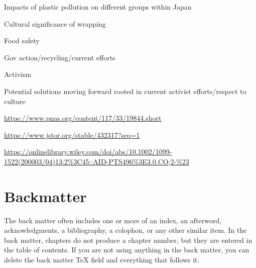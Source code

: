 \documentclass{book}\usepackage{knitr}
\begin{document}
Impacts of plastic pollution on different groups within Japan

Cultural significance of wrapping

Food safety

Gov action/recycling/current efforts

Activism

Potential solutions moving forward rooted in current activist efforts/respect to culture

\url{https://www.pnas.org/content/117/33/19844.short}

\url{https://www.jstor.org/stable/432317?seq=1}

\url{https://onlinelibrary.wiley.com/doi/abs/10.1002/1099-1522(200003/04)13:2%3C45::AID-PTS496%3E3.0.CO;2-%23}





\backmatter

\part{Backmatter}

The back matter often includes one or more of an index, an afterword, acknowledgments, a bibliography, a colophon, or any other similar item. In the back matter, chapters do not produce a chapter number, but they are entered in the table of contents. If you are not using anything in the back matter, you can delete the back matter TeX field and everything that follows it.

\printglossary

\renewcommand\bibname{References}
\setlength{\bibsep}{2\baselineskip}
\setlength\bibindent{.5in}


\end{document}
